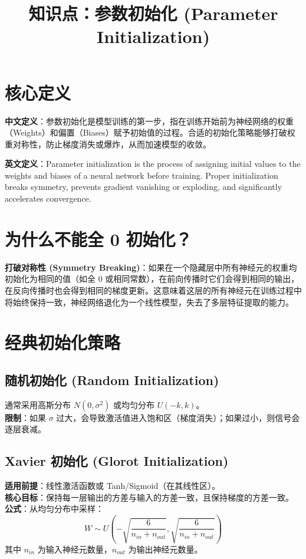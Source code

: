 \documentclass[12pt, a4paper]{article}
\title{知识点：参数初始化 (Parameter Initialization)}
\author{}
\date{}
\begin{document}
\maketitle

\section{核心定义}
\textbf{中文定义}：参数初始化是模型训练的第一步，指在训练开始前为神经网络的权重（Weights）和偏置（Biases）赋予初始值的过程。合适的初始化策略能够打破权重对称性，防止梯度消失或爆炸，从而加速模型的收敛。

\textbf{英文定义}：Parameter initialization is the process of assigning initial values to the weights and biases of a neural network before training. Proper initialization breaks symmetry, prevents gradient vanishing or exploding, and significantly accelerates convergence.

\section{为什么不能全 0 初始化？}
\textbf{打破对称性 (Symmetry Breaking)}：如果在一个隐藏层中所有神经元的权重均初始化为相同的值（如全 0 或相同常数），在前向传播时它们会得到相同的输出，在反向传播时也会得到相同的梯度更新。这意味着这层的所有神经元在训练过程中将始终保持一致，神经网络退化为一个线性模型，失去了多层特征提取的能力。

\section{经典初始化策略}

\subsection{随机初始化 (Random Initialization)}
通常采用高斯分布 $N(0, \sigma^2)$ 或均匀分布 $U(-k, k)$。
\\ \textbf{限制}：如果 $\sigma$ 过大，会导致激活值进入饱和区（梯度消失）；如果过小，则信号会逐层衰减。

\subsection{Xavier 初始化 (Glorot Initialization)}
\textbf{适用前提}：线性激活函数或 Tanh/Sigmoid（在其线性区）。
\\ \textbf{核心目标}：保持每一层输出的方差与输入的方差一致，且保持梯度的方差一致。
\\ \textbf{公式}：从均匀分布中采样：
$$ W \sim U\left( -\sqrt{\frac{6}{n_{in} + n_{out}}}, \sqrt{\frac{6}{n_{in} + n_{out}}} \right) $$
其中 $n_{in}$ 为输入神经元数量，$n_{out}$ 为输出神经元数量。
\end{document}
